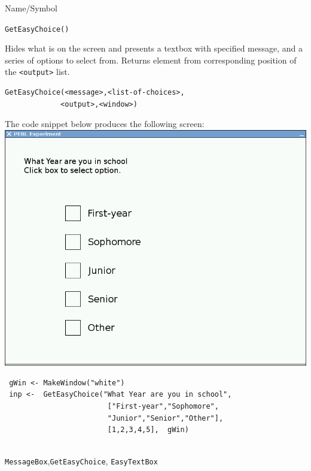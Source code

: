   
\begin{desc}{Name/Symbol}
\item[Name/Symbol]	\verb+GetEasyChoice()+

\item[Description]	Hides what is on the screen and presents a textbox with
  specified message, and a series of options to select from. Returns element from corresponding position of the \verb+<output>+ list.  

\item[Usage]		
\begin{verbatim}
GetEasyChoice(<message>,<list-of-choices>,
             <output>,<window>)
\end{verbatim}

\item[Example]	
The code snippet below produces the following screen:\\
\includegraphics[scale=.25]{images/EasyChoice.png}
\begin{verbatim}
 gWin <- MakeWindow("white")
 inp <-  GetEasyChoice("What Year are you in school",
                        ["First-year","Sophomore",
                        "Junior","Senior","Other"],
                        [1,2,3,4,5],  gWin)
 

\end{verbatim}

\item[See Also]\verb+MessageBox+,\verb+GetEasyChoice+, \verb+EasyTextBox+
\end{desc}

  
  
